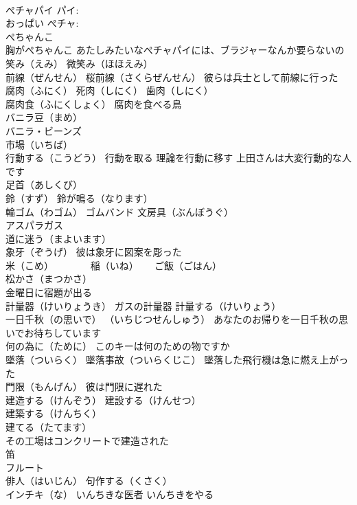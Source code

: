 \documentclass[8pt]{extreport}
\begin{document}
\begin{CJK}{UTF8}{min}
\\	ぺチャパイ パイ: 
\\	おっぱい ぺチャ: 
\\	ぺちゃんこ 
\\	胸がぺちゃんこ あたしみたいなぺチャパイには、ブラジャーなんか要らないの
\\	笑み（えみ） 微笑み（ほほえみ）
\\	前線（ぜんせん） 桜前線（さくらぜんせん） 彼らは兵士として前線に行った
\\	腐肉（ふにく） 死肉（しにく） 歯肉（しにく）
\\	腐肉食（ふにくしょく） 腐肉を食べる鳥
\\	バニラ豆（まめ） 
\\	バニラ・ビーンズ
\\	市場（いちば）
\\	行動する（こうどう） 行動を取る 理論を行動に移す 上田さんは大変行動的な人です
\\	足首（あしくび）
\\	鈴（すず） 鈴が鳴る（なります）
\\	輪ゴム（わゴム） ゴムバンド 文房具（ぶんぼうぐ）
\\	アスパラガス
\\	道に迷う（まよいます）
\\	象牙（ぞうげ） 彼は象牙に図案を彫った
\\	米（こめ）　　　　 稲（いね） 　 ご飯（ごはん）
\\	松かさ（まつかさ）
\\	金曜日に宿題が出る
\\	計量器（けいりょうき） ガスの計量器 計量する（けいりょう）
\\	一日千秋（の思いで） （いちじつせんしゅう） あなたのお帰りを一日千秋の思いでお待ちしています
\\	何の為に（ために） このキーは何のための物ですか
\\	墜落（ついらく） 墜落事故（ついらくじこ） 墜落した飛行機は急に燃え上がった
\\	門限（もんげん） 彼は門限に遅れた
\\	建造する（けんぞう） 建設する（けんせつ）
\\	建築する（けんちく）
\\	建てる（たてます）
\\	その工場はコンクリートで建造された
\\	笛 
\\	フルート　
\\	俳人（はいじん） 句作する（くさく）
\\	インチキ（な） いんちきな医者 いんちきをやる

\end{CJK}
\end{document}
